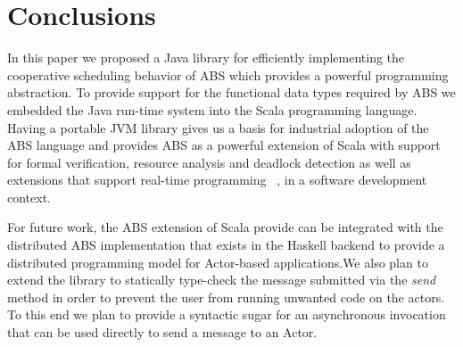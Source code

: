 \section{Conclusions}
\label{conc}
In this paper we proposed a Java library for efficiently implementing the cooperative scheduling behavior of ABS which provides a powerful programming abstraction. 
To provide support for the functional data types required by ABS we embedded the Java run-time system into the Scala programming language. Having a portable JVM library gives us a basis for industrial adoption of the ABS language and provides ABS as a powerful extension of Scala with support for formal verification, resource analysis and deadlock detection as well as extensions that support real-time programming ~\cite{rabs}, in a software development context.


\par For future work, the ABS extension of Scala provide can be integrated with the distributed ABS implementation that exists in the Haskell backend \cite{cloud} to provide a distributed programming model for Actor-based applications.We also plan to extend the library to statically type-check the message submitted via the \textit{send} method in order to prevent the user from running unwanted code on the actors. To this end we plan to provide a syntactic sugar for an asynchronous invocation that can be used directly to send a message to an Actor.








